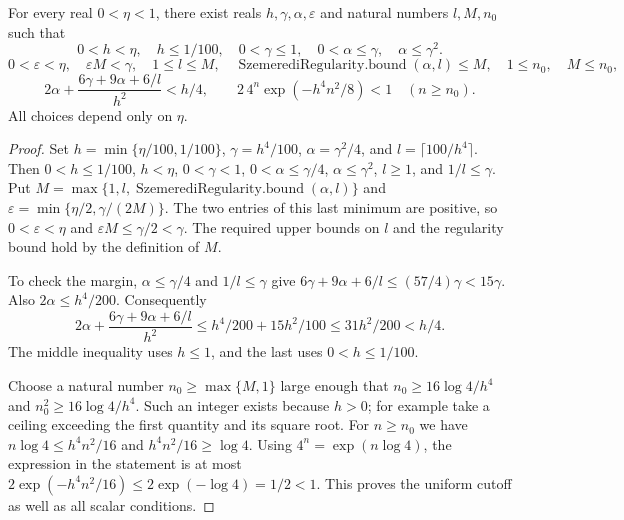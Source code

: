 \begin{lemma}
For every real $0<\eta<1$, there exist reals $h,\gamma,\alpha,\varepsilon$
and natural numbers $l,M,n_0$ such that
\[
 0<h<\eta,\quad h\leq1/100,\quad
 0<\gamma\leq1,\quad 0<\alpha\leq\gamma,\quad\alpha\leq\gamma^2.
\]
\[
 0<\varepsilon<\eta,\quad \varepsilon M<\gamma,\quad
 1\leq l\leq M,\quad
 \operatorname{SzemerediRegularity.bound}(\alpha,l)\leq M,
 \quad1\leq n_0,\quad M\leq n_0,
\]
\[
 2\alpha+\frac{6\gamma+9\alpha+6/l}{h^2}<h/4,
 \qquad
 2\,4^n\exp(-h^4n^2/8)<1\quad(n\geq n_0).
\]
All choices depend only on $\eta$.
\end{lemma}
\begin{proof}
Set $h=\min\{\eta/100,1/100\}$, $\gamma=h^4/100$,
$\alpha=\gamma^2/4$, and $l=\lceil100/h^4\rceil$.
Then $0<h\leq1/100$, $h<\eta$, $0<\gamma<1$,
$0<\alpha\leq\gamma/4$, $\alpha\leq\gamma^2$, $l\geq1$,
and $1/l\leq\gamma$. Put
$M=\max\{1,l,\operatorname{SzemerediRegularity.bound}(\alpha,l)\}$
and $\varepsilon=\min\{\eta/2,\gamma/(2M)\}$.
The two entries of this last minimum are positive, so
$0<\varepsilon<\eta$ and $\varepsilon M\leq\gamma/2<\gamma$.
The required upper bounds on $l$ and the regularity bound hold by
the definition of $M$.

To check the margin, $\alpha\leq\gamma/4$ and $1/l\leq\gamma$
give $6\gamma+9\alpha+6/l\leq(57/4)\gamma<15\gamma$.
Also $2\alpha\leq h^4/200$. Consequently
\[
 2\alpha+\frac{6\gamma+9\alpha+6/l}{h^2}
 \leq h^4/200+15h^2/100
 \leq31h^2/200<h/4.
\]
The middle inequality uses $h\leq1$, and the last uses
$0<h\leq1/100$.

Choose a natural number $n_0\geq\max\{M,1\}$ large enough that
$n_0\geq16\log4/h^4$ and
$n_0^2\geq16\log4/h^4$. Such an integer exists because $h>0$;
for example take a ceiling exceeding the first quantity and its
square root. For $n\geq n_0$ we have
$n\log4\leq h^4n^2/16$ and $h^4n^2/16\geq\log4$.
Using $4^n=\exp(n\log4)$, the expression in the statement is at most
$2\exp(-h^4n^2/16)\leq2\exp(-\log4)=1/2<1$.
This proves the uniform cutoff as well as all scalar conditions.
\end{proof}
